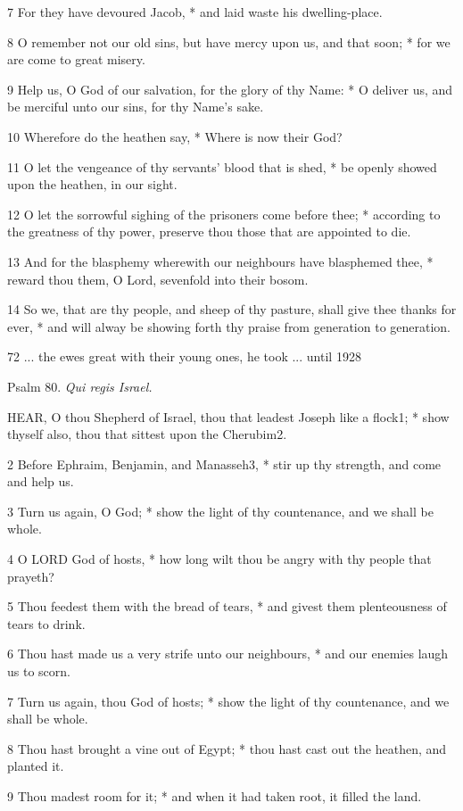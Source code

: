 7 For they have devoured Jacob, * and laid waste his
dwelling-place.

8 O remember not our old sins, but have mercy upon
us, and that soon; * for we are come to great misery.

9 Help us, O God of our salvation, for the glory of
thy Name: * O deliver us, and be merciful unto our sins, for thy Name's
sake.

10 Wherefore do the heathen say, * Where is now their
God?

11 O let the vengeance of thy servants' blood that
is shed, * be openly showed upon the heathen, in our sight.

12 O let the sorrowful sighing of the prisoners come
before thee; * according to the greatness of thy power, preserve thou
those that are appointed to die.

13 And for the blasphemy wherewith our neighbours have
blasphemed thee, * reward thou them, O Lord, sevenfold into their bosom.

14 So we, that are thy people, and sheep of thy pasture,
shall give thee thanks for ever, * and will alway be showing forth thy
praise from generation to generation.

72 ... the ewes great with
their young ones, he took ...
until 1928

Psalm
80. \emph{Qui regis Israel.}

HEAR,
O thou Shepherd of Israel, thou that leadest Joseph like a flock1;
* show thyself also, thou that sittest upon the Cherubim2.

2 Before Ephraim, Benjamin, and Manasseh3,
* stir up thy strength, and come and help us.

3 Turn us again, O God; * show the light of thy countenance,
and we shall be whole.

4 O LORD God of hosts, * how long wilt thou be angry
with thy people that prayeth?

5 Thou feedest them with the bread of tears, * and
givest them plenteousness of tears to drink.

6 Thou hast made us a very strife unto our neighbours,
* and our enemies laugh us to scorn.

7 Turn us again, thou God of hosts; * show the light
of thy countenance, and we shall be whole.

8 Thou hast brought a vine out of Egypt; * thou hast
cast out the heathen, and planted it.

9 Thou madest room for it; * and when it had taken
root, it filled the land.

